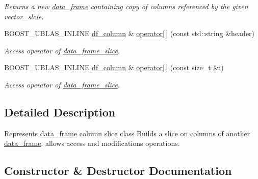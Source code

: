 \begin{DoxyCompactItemize}
\begin{DoxyCompactList}\small\item\em Returns a new \hyperlink{classboost_1_1numeric_1_1ublas_1_1data__frame}{data\+\_\+frame} containing copy of columns referenced by the given vector\+\_\+slcie. \end{DoxyCompactList}\item 
B\+O\+O\+S\+T\+\_\+\+U\+B\+L\+A\+S\+\_\+\+I\+N\+L\+I\+NE \hyperlink{classboost_1_1numeric_1_1ublas_1_1df__column}{df\+\_\+column} \& \hyperlink{classboost_1_1numeric_1_1ublas_1_1data__frame__slice_a575f53947d4aa935ec63035df39ca19a}{operator\mbox{[}$\,$\mbox{]}} (const std\+::string \&header)
\begin{DoxyCompactList}\small\item\em Access operator of \hyperlink{classboost_1_1numeric_1_1ublas_1_1data__frame__slice}{data\+\_\+frame\+\_\+slice}. \end{DoxyCompactList}\item 
B\+O\+O\+S\+T\+\_\+\+U\+B\+L\+A\+S\+\_\+\+I\+N\+L\+I\+NE \hyperlink{classboost_1_1numeric_1_1ublas_1_1df__column}{df\+\_\+column} \& \hyperlink{classboost_1_1numeric_1_1ublas_1_1data__frame__slice_a9df845f93d29e0707e39eb94ccc27b57}{operator\mbox{[}$\,$\mbox{]}} (const size\+\_\+t \&i)
\begin{DoxyCompactList}\small\item\em Access operator of \hyperlink{classboost_1_1numeric_1_1ublas_1_1data__frame__slice}{data\+\_\+frame\+\_\+slice}. \end{DoxyCompactList}\end{DoxyCompactItemize}


\subsection{Detailed Description}
Represents \hyperlink{classboost_1_1numeric_1_1ublas_1_1data__frame}{data\+\_\+frame} column slice class Builds a slice on columns of another \hyperlink{classboost_1_1numeric_1_1ublas_1_1data__frame}{data\+\_\+frame}. allows access and modifications operations. 

\subsection{Constructor \& Destructor Documentation}
